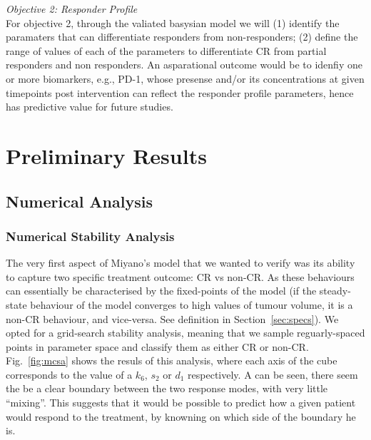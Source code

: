 \documentclass[11pt]{article}
\begin{document}
\textit{Objective 2: Responder Profile}\\[3pt]
For objective 2, through the valiated basysian model we will (1) identify the paramaters that can differentiate responders from non-responders; (2) define the range of values of each of the  parameters to differentiate CR from partial responders and non responders.  An asparational outcome would be to idenfiy one or more biomarkers, e.g., PD-1, whose presense and/or its concentrations at given timepoints post intervention can reflect the responder profile parameters, hence has predictive value for future studies.

\section{Preliminary Results}

\subsection{Numerical Analysis}
\subsubsection{Numerical Stability Analysis}

The very first aspect of Miyano's model that we wanted to verify was its ability to capture two specific treatment outcome: CR vs non-CR. As these behaviours can essentially be characterised by the fixed-points of the model (if the steady-state behaviour of the model converges to high values of tumour volume, it is a non-CR behaviour, and vice-versa. See definition in Section~\ref{sec:specs}). We opted for a grid-search stability analysis, meaning that we sample reguarly-spaced points in parameter space and classify them as either CR or non-CR. Fig.~\ref{fig:mcsa} shows the resuls of this analysis, where each axis of the cube corresponds to the value of a $k_6$, $s_2$ or $d_1$ respectively. A can be seen, there seem the be a clear boundary between the two response modes, with very little ``mixing''. This suggests that it would be possible to predict how a given patient would respond to the treatment, by knowning on which side of the boundary he is.
\end{document}
